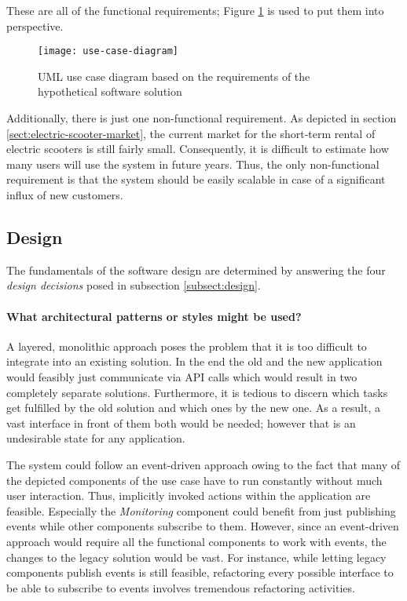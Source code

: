 \documentclass[12pt,a4paper]{report}
\begin{document}
These are all of the functional requirements;
Figure \ref{fig:use-case-diagram} is used to put them into perspective.\\

\begin{figure}[htbp]
\centering
\texttt{[image: use-case-diagram]}
\caption{UML use case diagram based on the requirements of the hypothetical software solution}
\label{fig:use-case-diagram}
\end{figure}

Additionally, there is just one non-functional requirement.
As depicted in section \ref{sect:electric-scooter-market}, the current market
for the short-term rental of electric scooters is still fairly small.
Consequently, it is difficult to estimate how many users will use the system
in future years. Thus, the only non-functional requirement is that the system
should be easily scalable in case of a significant influx of new customers.


\subsection{Design}

The fundamentals of the software design are determined by answering the four
\textit{design decisions} posed in subsection \ref{subsect:design}.

\paragraph{What architectural patterns or styles might be used?}
A layered, monolithic approach poses the problem that it is too difficult
to integrate into an existing solution. In the end the old and the new
application would feasibly just communicate via API calls which would result
in two completely separate solutions. Furthermore, it is tedious to discern
which tasks get fulfilled by the old solution and which ones by the new one.
As a result, a vast interface in front of them both would be needed;
however that is an undesirable state for any application.

The system could follow an event-driven approach owing to the fact that
many of the depicted components of the use case have to run constantly without
much user interaction. Thus, implicitly invoked actions within the application
are feasible. Especially the \textit{Monitoring} component could benefit from
just publishing events while other components subscribe to them.
However, since an event-driven approach would require all the
functional components to work with events, the changes to the legacy solution
would be vast. For instance, while letting legacy components publish events
is still feasible, refactoring every possible interface to be able
to subscribe to events involves tremendous refactoring activities.
\end{document}
